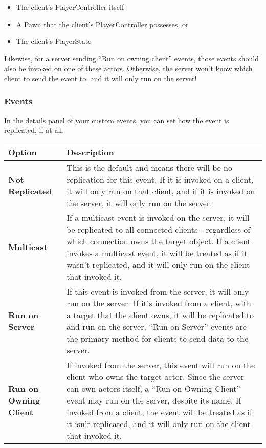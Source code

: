\documentclass[
  letterpaper,
  DIV=11,
  numbers=noendperiod]{scrartcl}
\providecommand{\tightlist}{%
  \setlength{\itemsep}{0pt}\setlength{\parskip}{0pt}}
\begin{document}
\begin{itemize}
\tightlist
\item
  The client's PlayerController itself
\item
  A Pawn that the client's PlayerController possesses, or
\item
  The client's PlayerState
\end{itemize}

Likewise, for a server sending ``Run on owning client'' events, those
events should also be invoked on one of these actors. Otherwise, the
server won't know which client to send the event to, and it will only
run on the server!

\subsubsection{Events}\label{events}

In the details panel of your custom events, you can set how the event is
replicated, if at all.

\begin{longtable}[]{@{}
  >{\raggedright\arraybackslash}p{}
  >{\raggedright\arraybackslash}p{}@{}}
\toprule\noalign{}
\begin{minipage}[b]{\linewidth}\raggedright
Option
\end{minipage} & \begin{minipage}[b]{\linewidth}\raggedright
Description
\end{minipage} \\
\midrule\noalign{}
\endhead
\bottomrule\noalign{}
\endlastfoot
\textbf{Not Replicated} & This is the default and means there will be no
replication for this event. If it is invoked on a client, it will only
run on that client, and if it is invoked on the server, it will only run
on the server. \\
\textbf{Multicast} & If a multicast event is invoked on the server, it
will be replicated to all connected clients - regardless of which
connection owns the target object. If a client invokes a multicast
event, it will be treated as if it wasn't replicated, and it will only
run on the client that invoked it. \\
\textbf{Run on Server} & If this event is invoked from the server, it
will only run on the server. If it's invoked from a client, with a
target that the client owns, it will be replicated to and run on the
server. ``Run on Server'' events are the primary method for clients to
send data to the server. \\
\textbf{Run on Owning Client} & If invoked from the server, this event
will run on the client who owns the target actor. Since the server can
own actors itself, a ``Run on Owning Client'' event may run on the
server, despite its name. If invoked from a client, the event will be
treated as if it isn't replicated, and it will only run on the client
that invoked it. \\
\end{longtable}
\end{document}
